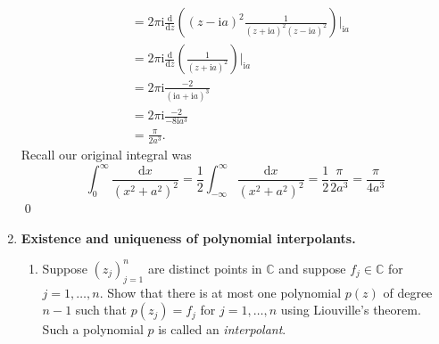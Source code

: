 \documentclass[10pt]{amsart}
\newcommand{\D}{\mathrm{d}}
\newcommand{\I}{\mathrm{i}}
\theoremstyle{nonumberplain}
\begin{document}
\begin{enumerate}[label={\bf {\arabic*}:}]
\begin{align*}
	&= 2\pi \I \frac {\D}{\D z} \left((z - \I a)^2\frac 1 {(z + \I a)^2(z - \I a)^2} \right)\Bigg|_{\I a} \\
	&= 2\pi \I \frac {\D}{\D z} \left(\frac 1 {(z + \I a)^2} \right)\Bigg|_{\I a} \\
	&= 2\pi \I \frac {-2} {(\I a + \I a)^3} \\
	&= 2\pi \I \frac {-2} {- 8 \I a^3} \\
	&= \frac \pi {2 a^3}.
\end{align*}
Recall our original integral was
$$
\int_0^\infty \frac {\D x}{ (x^2 + a^2)^2 }
	= \frac 1 2 \int_{-\infty}^\infty \frac {\D x}{ (x^2 + a^2)^2 }
	= \frac 1 2 \frac \pi {2 a^3}
	= \frac \pi {4a^3}
$$
\qed \\

\newpage


\item  \textbf{Existence and uniqueness of polynomial interpolants.}
\begin{enumerate}
\item Suppose $(z_j)_{j = 1}^n$ are distinct points in $\mathbb C$ and suppose $f_j \in \mathbb C$ for $j = 1,\ldots,n$.
Show that there is at most one polynomial $p(z)$ of degree $n-1$ such that $p(z_j) = f_j$ for $j = 1,\ldots,n$ using Liouville's theorem.
Such a polynomial $p$ is called an \emph{interpolant}. \\


\end{enumerate}
\end{enumerate}
\end{document}
